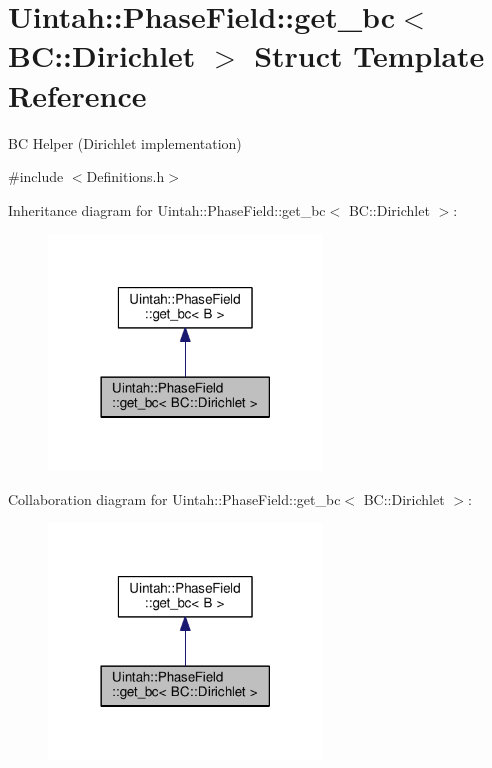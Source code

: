 \hypertarget{structUintah_1_1PhaseField_1_1get__bc_3_01BC_1_1Dirichlet_01_4}{}\section{Uintah\+:\+:Phase\+Field\+:\+:get\+\_\+bc$<$ BC\+:\+:Dirichlet $>$ Struct Template Reference}
\label{structUintah_1_1PhaseField_1_1get__bc_3_01BC_1_1Dirichlet_01_4}


BC Helper (Dirichlet implementation)  




{\ttfamily \#include $<$Definitions.\+h$>$}



Inheritance diagram for Uintah\+:\+:Phase\+Field\+:\+:get\+\_\+bc$<$ BC\+:\+:Dirichlet $>$\+:\nopagebreak
\begin{figure}[H]
\begin{center}
\leavevmode
\includegraphics[width=206pt]{structUintah_1_1PhaseField_1_1get__bc_3_01BC_1_1Dirichlet_01_4__inherit__graph}
\end{center}
\end{figure}


Collaboration diagram for Uintah\+:\+:Phase\+Field\+:\+:get\+\_\+bc$<$ BC\+:\+:Dirichlet $>$\+:\nopagebreak
\begin{figure}[H]
\begin{center}
\leavevmode
\includegraphics[width=206pt]{structUintah_1_1PhaseField_1_1get__bc_3_01BC_1_1Dirichlet_01_4__coll__graph}
\end{center}
\end{figure}
